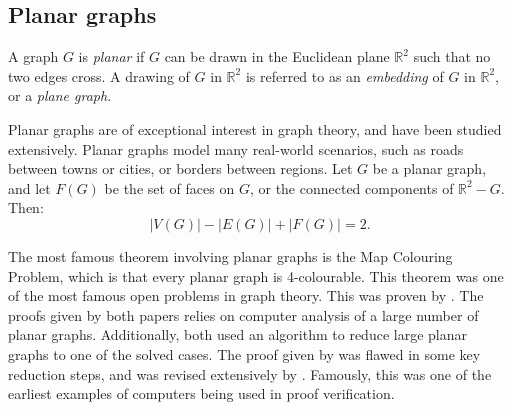 \subsection{Planar graphs}
A graph \(G\) is \textit{planar} if \(G\) can be drawn in the Euclidean plane \( \mathbb{R}^2 \) such that no two edges cross. A drawing of $G$ in $\mathbb{R}^2$ is referred to as an \textit{embedding} of $G$ in $\mathbb{R}^2$, or a \textit{plane graph}. 

Planar graphs are of exceptional interest in graph theory, and have been studied extensively. Planar graphs model many real-world scenarios, such as roads between towns or cities, or borders between regions.
Let $G$ be a planar graph, and let $F(G)$ be the set of faces on $G$, or the connected components of $\mathbb{R}^2 - G$. Then:
\begin{equation}
	|V(G)| - |E(G)| + |F(G)| = 2. 
\end{equation}

The most famous theorem involving planar graphs is the Map Colouring Problem,  which is that every planar graph is 4-colourable. 
This theorem was one of the most famous open problems in graph theory.
This was proven by \textcite{appelEveryPlanarMap1989,robertsonEfficientlyFourcoloringPlanar1996}. The proofs given by both papers relies on computer analysis of a large number of planar graphs. Additionally, both used an algorithm to reduce large planar graphs to one of the solved cases. The proof given by \textcite{appelEveryPlanarMap1989} was flawed in some key reduction steps, and was revised extensively by \textcite{robertsonEfficientlyFourcoloringPlanar1996}. Famously, this was one of the earliest examples of computers being used in proof verification.
